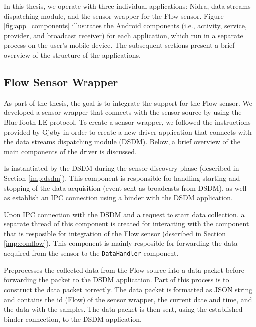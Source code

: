 In this thesis, we operate with three individual applications: Nidra, data streams dispatching module, and the sensor wrapper for the Flow sensor. Figure \ref{fig:app_components} illustrates the Android components (i.e., activity, service, provider, and broadcast receiver) for each application, which run in a separate process on the user's mobile device. The subsequent sections present a brief overview of the structure of the applications.


\subsection{Flow Sensor Wrapper}
As part of the thesis, the goal is to integrate the support for the Flow sensor. We developed a sensor wrapper that connects with the sensor source by using the BlueTooth LE protocol. To create a sensor wrapper, we followed the instructions provided by Gjøby in order to create a new driver application that connects with the data streams dispatching module (DSDM). Below, a brief overview of the main components of the driver is discussed.

\begin{description}[font=\normalfont\itshape]
    \item[WrapperService:] Is instantiated by the DSDM during the sensor discovery phase (described in Section \ref{imp:dsdm}). This component is responsible for handling starting and stopping of the data acquisition (event sent as broadcasts from DSDM), as well as establish an IPC connection using a binder with the DSDM application. 
    \item[CommunicationHandler:] Upon IPC connection with the DSDM and a request to start data collection, a separate thread of this component is created for interacting with the component that is resposible for integration of the Flow sensor (described in Section \ref{imp:comflow}). This component is mainly resposible for forwarding the data acquired from the sensor to the \verb|DataHandler| component. 
    \item[DataHandler:] Preprocesses the collected data from the Flow source into a data packet before forwarding the packet to the DSDM application. Part of this process is to construct the data packet correctly. The data packet is formatted as JSON string and contains the id (Flow) of the sensor wrapper, the current date and time, and the data with the samples. The data packet is then sent, using the established binder connection, to the DSDM application.
\end{description}

